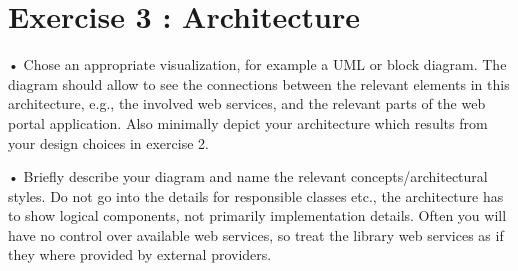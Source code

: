 \section{Exercise 3 : Architecture}

    • Chose an appropriate visualization, for example a UML or block diagram. The
    diagram should allow to see the connections between the relevant elements in this
    architecture, e.g., the involved web services, and the relevant parts of the web
    portal application. Also minimally depict your architecture which results from
    your design choices in exercise 2.

    • Briefly describe your diagram and name the relevant concepts/architectural styles.
    Do not go into the details for responsible classes etc., the architecture has to show
    logical components, not primarily implementation details. Often you will have no
    control over available web services, so treat the library web services as if they where
    provided by external providers.
